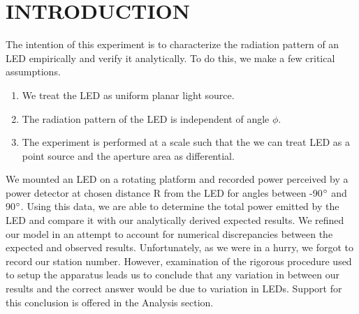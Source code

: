 \section{INTRODUCTION}
The intention of this experiment is to characterize the radiation pattern of an LED empirically and verify it analytically. To do this, we make a few critical assumptions.
\begin{enumerate}
\item We treat the LED as uniform planar light source.
\item The radiation pattern of the LED is independent of angle $\phi$.
\item The experiment is performed at a scale such that the we can treat LED as a point source and the aperture area as differential.
\end{enumerate}

We mounted an LED on a rotating platform and recorded power perceived by a power detector at chosen distance R from the LED for angles between -90$\degree$ and 90$\degree$. Using this data, we are able to determine the total power emitted by the LED and compare it with our analytically derived expected results. We refined our model in an attempt to account for numerical discrepancies between the expected and observed results. Unfortunately, as we were in a hurry, we forgot to record our station number. However, examination of the rigorous procedure used to setup the apparatus leads us to conclude that any variation in between our results and the correct answer would be due to variation in LEDs. Support for this conclusion is offered in the Analysis section.